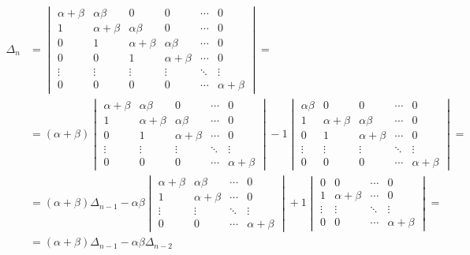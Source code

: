 \documentclass[11pt, letter, utf-8]{article}
\begin{document}
    \begin{align*}
        \Delta_n &= 
        \begin{vmatrix}
            \alpha + \beta & \alpha \beta & 0 & 0 & \cdots & 0 \\
            1 & \alpha + \beta & \alpha \beta & 0 & \cdots & 0 \\
            0 & 1 & \alpha + \beta & \alpha \beta & \cdots & 0 \\
            0 & 0 & 1 & \alpha + \beta & \cdots & 0\\
            \vdots & \vdots & \vdots & \vdots & \ddots & \vdots\\
            0 & 0 & 0 & 0 & \cdots & \alpha + \beta 
        \end{vmatrix} = \\
        &=
        (\alpha + \beta)
        \begin{vmatrix}
            \alpha + \beta & \alpha \beta & 0 & \cdots & 0 \\
            1 & \alpha + \beta & \alpha \beta & \cdots & 0 \\
            0 & 1 & \alpha + \beta & \cdots & 0 \\
            \vdots & \vdots & \vdots & \ddots & \vdots\\
            0 & 0 & 0 & \cdots & \alpha + \beta 
        \end{vmatrix}
        - 1 \begin{vmatrix}
            \alpha \beta & 0 & 0 & \cdots & 0 \\
            1 & \alpha + \beta & \alpha \beta & \cdots & 0 \\
            0 & 1 & \alpha + \beta & \cdots & 0 \\
            \vdots & \vdots & \vdots & \ddots & \vdots \\
            0 & 0 & 0 & \cdots & \alpha + \beta
        \end{vmatrix} = \\
        &= (\alpha + \beta) \Delta_{n-1} - \alpha \beta \begin{vmatrix}
            \alpha + \beta & \alpha \beta & \cdots & 0 \\
            1 & \alpha + \beta & \cdots & 0 \\
            \vdots & \vdots & \ddots & \vdots \\
            0 & 0 & \cdots & \alpha + \beta 
        \end{vmatrix}
        + 1 \begin{vmatrix}
            0 & 0 & \cdots & 0 \\
            1 & \alpha + \beta & \cdots & 0 \\
            \vdots & \vdots & \ddots & \vdots \\
            0 & 0 & \cdots & \alpha + \beta
        \end{vmatrix} = \\
        &= (\alpha + \beta) \Delta_{n-1} - \alpha \beta \Delta_{n-2}
    \end{align*}
\end{document}
